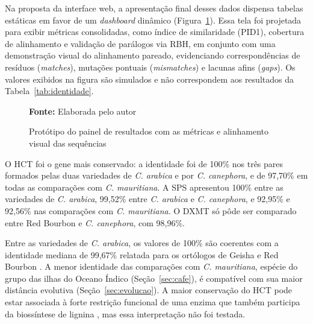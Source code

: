 Na proposta da interface web, a apresentação final desses dados dispensa tabelas estáticas em favor de um \textit{dashboard} dinâmico (Figura~\ref{fig:tela_resultados}). Essa tela foi projetada para exibir métricas consolidadas, como índice de similaridade (PID1), cobertura de alinhamento e validação de parálogos via RBH, em conjunto com uma demonstração visual do alinhamento pareado, evidenciando correspondências de resíduos (\textit{matches}), mutações pontuais (\textit{mismatches}) e lacunas afins (\textit{gaps}). Os valores exibidos na figura são simulados e não correspondem aos resultados da Tabela~\ref{tab:identidade}.


\begin{figure}[!htbp]
	\centering
	\vspace{1.0cm}
	
	
	\vspace{1.0cm}
	\caption{Protótipo do painel de resultados com as métricas e alinhamento visual das sequências}
	\label{fig:tela_resultados}
	\par\vspace{0.2cm}
	\textbf{Fonte:} Elaborada pelo autor
\end{figure}
\FloatBarrier



O HCT foi o gene mais conservado: a identidade foi de 100\% nos três pares formados pelas duas variedades de \textit{C. arabica} e por \textit{C. canephora}, e de 97,70\% em todas as comparações com \textit{C. mauritiana}. A SPS apresentou 100\% entre as variedades de \textit{C. arabica}, 99,52\% entre \textit{C. arabica} e \textit{C. canephora}, e 92,95\% e 92,56\% nas comparações com \textit{C. mauritiana}. O DXMT só pôde ser comparado entre Red Bourbon e \textit{C. canephora}, com 98,96\%.

Entre as variedades de \textit{C. arabica}, os valores de 100\% são coerentes com a identidade mediana de 99,67\% relatada para os ortólogos de Geisha e Red Bourbon \cite{Medrano2025}. A menor identidade das comparações com \textit{C. mauritiana}, espécie do grupo das ilhas do Oceano Índico (Seção~\ref{sec:cafe}), é compatível com sua maior distância evolutiva (Seção~\ref{sec:evolucao}). A maior conservação do HCT pode estar associada à forte restrição funcional de uma enzima que também participa da biossíntese de lignina \cite{Lallemand2012}, mas essa interpretação não foi testada.

